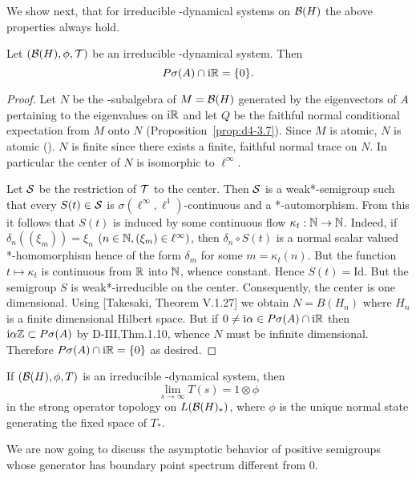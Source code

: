 We show next, that for irreducible \WA-dynamical systems on $ \mathcal{B}(H) $  the above properties always hold.
\begin{theorem}\label{thm:d4-3.8}
Let $ (\mathcal{B}(H),\phi,\mathcal{T}) $  be an irreducible \WA-dynamical system.
Then
\[
P\sigma(A) \cap \mathrm{i}\mathbb{R} = \{0\} .
\]

\end{theorem}
\begin{proof}
Let $ N $  be the \WA-subalgebra of $ M = \mathcal{B}(H) $  generated by the eigenvectors of $ A $  pertaining to the eigenvalues on $ \mathrm{i}\mathbb{R} $  and let $ Q $  be the faithful normal conditional expectation from $ M $  onto $ N $  (Proposition~\ref{prop:d4-3.7}).
Since $ M $  is atomic, $ N $  is atomic (\citet{stormer:1972}).
$ N $  is finite since there exists a finite, faithful normal trace on $ N $.
In particular the center of $ N $  is isomorphic to $ \ell^{\infty} $.

Let $ \mathcal{S} $  be the restriction of $ \mathcal{T} $  to the center.
Then $ \mathcal{S} $  is a weak*-semigroup such that every $ S(t) \in \mathcal{S} $  is $ \sigma(\ell^{\infty},\ell^{1}) $-continuous and a *-automorphism.
From this it follows that $ S(t) $  is induced by some continuous flow $ \kappa_{t}: \mathbb{N} \to \mathbb{N} $.
Indeed, if $ \delta_{n}((\xi_{m})) = \xi_{n} $  $ (n \in \mathbb{N}, (\xi_{m}) \in \ell^{\infty}) $, then $ \delta_{n} \circ S(t) $  is a normal scalar valued *-homomorphism hence of the form $ \delta_{m} $  for some $ m = \kappa_{t}(n) $.
But the function $ t \mapsto \kappa_{t} $  is continuous from $ \mathbb{R} $  into $ \mathbb{N} $, whence constant.
Hence $ S(t) = \text{Id} $.
But the semigroup $ S $  is weak*-irreducible on the center.
Consequently, the center is one dimensional.
Using [Takesaki, Theorem V.1.27] we obtain $ N = B(H_{n}) $  where $ H_{n} $  is a finite dimensional Hilbert space.
But if $ 0 \neq \mathrm{i}\alpha \in P\sigma(A) \cap \mathrm{i}\mathbb{R} $  then $ \mathrm{i}\alpha\mathbb{Z} \subset P\sigma(A) $  by D-III,Thm.1.10, whence $ N $  must be infinite dimensional.
Therefore $ P\sigma(A) \cap \mathrm{i}\mathbb{R} = \{0\} $  as desired.
\end{proof}
\begin{corollary}\label{cor:d4-3.9}
If $ (\mathcal{B}(H),\phi,T) $  is an irreducible \WA-dynamical system, then
\[
	\lim_{s \to \infty} T(s) = 1 \otimes \phi
\]
in the strong operator topology on $ L(\mathcal{B}(H)_{*}) $, where $ \phi $  is the unique normal state generating the fixed space of $ T_{*} $.
\end{corollary}
We are now going to discuss the asymptotic behavior of positive semigroups whose generator has boundary point spectrum different from $ 0 $.
